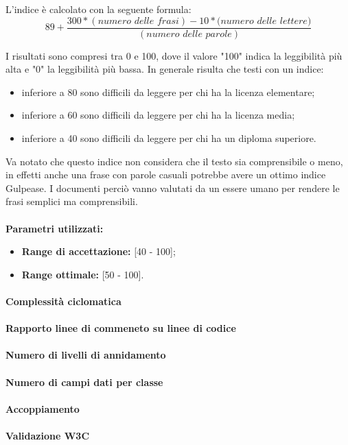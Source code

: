 \documentclass[12pt,a4paper,titlepage]{article}
\begin{document}
			L'indice è calcolato con la seguente formula:
			\[89+\frac{300*(\textit{numero delle frasi})-10*(\textit{numero delle lettere)}}{(\textit{numero delle parole})}\]
			
			I risultati sono compresi tra 0 e 100, dove il valore "100" indica la leggibilità più alta e "0" la leggibilità più bassa. In generale risulta che testi con un indice:
			\begin{itemize}
				\item inferiore a 80 sono difficili da leggere per chi ha la licenza elementare;
				\item inferiore a 60 sono difficili da leggere per chi ha la licenza media;
				\item inferiore a 40 sono difficili da leggere per chi ha un diploma superiore.
			\end{itemize}
			Va notato che questo indice non considera che il testo sia comprensibile o meno, in effetti anche una frase con parole casuali potrebbe avere un ottimo indice Gulpease. I documenti perciò vanno valutati da un essere umano per rendere le frasi semplici ma comprensibili.
			\\ \\
			\textbf{Parametri utilizzati:}
			\begin{itemize}
				\item \textbf{Range di accettazione:} [40 - 100];
				\item \textbf{Range ottimale:} [50 - 100].
			\end{itemize}
			\paragraph{Complessità ciclomatica}
			\paragraph{Rapporto linee di commeneto su linee di codice}
			\paragraph{Numero di livelli di annidamento}
			\paragraph{Numero di campi dati per classe}
			\paragraph{Accoppiamento}
			\paragraph{Validazione W3C}
			
	
\end{document}
